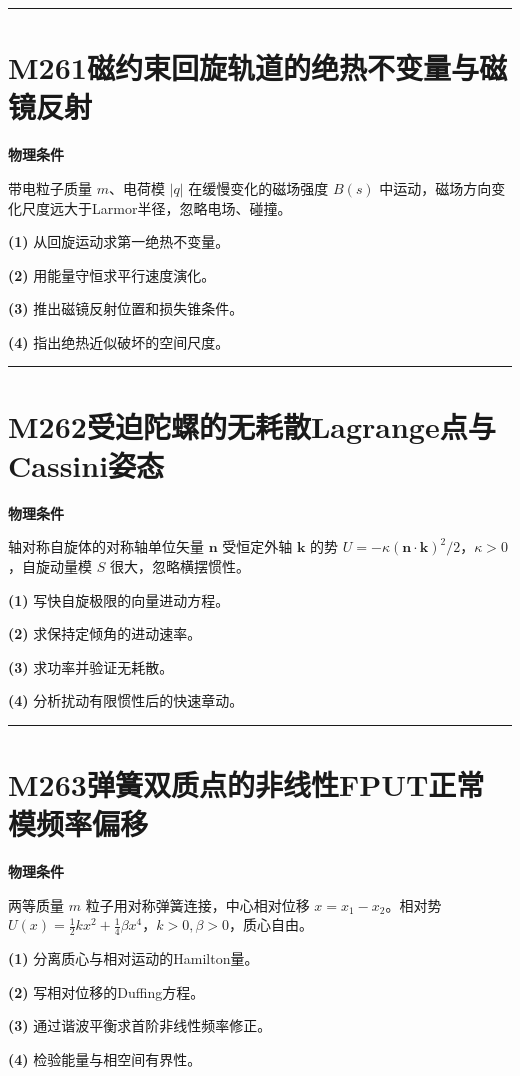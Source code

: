 \documentclass[UTF8,a4paper,11pt,oneside,openany]{ctexbook}
\begin{document}
\par\bigskip\hrule\bigskip
\section*{M261\quad 磁约束回旋轨道的绝热不变量与磁镜反射}
\textbf{物理条件}\par 带电粒子质量 \(m\)、电荷模 \(|q|\) 在缓慢变化的磁场强度 \(B(s)\) 中运动，磁场方向变化尺度远大于Larmor半径，忽略电场、碰撞。
\par\noindent\textbf{(1)} 从回旋运动求第一绝热不变量。
\par\noindent\textbf{(2)} 用能量守恒求平行速度演化。
\par\noindent\textbf{(3)} 推出磁镜反射位置和损失锥条件。
\par\noindent\textbf{(4)} 指出绝热近似破坏的空间尺度。

\par\bigskip\hrule\bigskip
\section*{M262\quad 受迫陀螺的无耗散Lagrange点与Cassini姿态}
\textbf{物理条件}\par 轴对称自旋体的对称轴单位矢量 \(\boldsymbol n\) 受恒定外轴 \(\boldsymbol k\) 的势 \(U=-\kappa(\boldsymbol n\cdot\boldsymbol k)^2/2\)，\(\kappa>0\)，自旋动量模 \(S\) 很大，忽略横摆惯性。
\par\noindent\textbf{(1)} 写快自旋极限的向量进动方程。
\par\noindent\textbf{(2)} 求保持定倾角的进动速率。
\par\noindent\textbf{(3)} 求功率并验证无耗散。
\par\noindent\textbf{(4)} 分析扰动有限惯性后的快速章动。

\par\bigskip\hrule\bigskip
\section*{M263\quad 弹簧双质点的非线性FPUT正常模频率偏移}
\textbf{物理条件}\par 两等质量 \(m\) 粒子用对称弹簧连接，中心相对位移 \(x=x_1-x_2\)。相对势 \(U(x)=\frac12kx^2+\frac14\beta x^4\)，\(k>0,\beta>0\)，质心自由。
\par\noindent\textbf{(1)} 分离质心与相对运动的Hamilton量。
\par\noindent\textbf{(2)} 写相对位移的Duffing方程。
\par\noindent\textbf{(3)} 通过谐波平衡求首阶非线性频率修正。
\par\noindent\textbf{(4)} 检验能量与相空间有界性。
\end{document}
